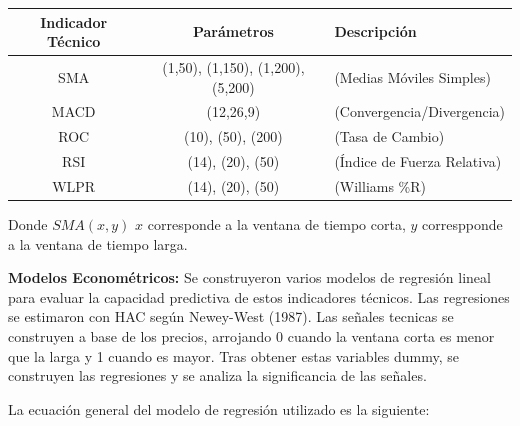 \documentclass[a0,portrait]{a0poster}
\begin{document}
\begin{multicols}{2}
\begin{minipage}{.984\linewidth}
        \begin{tabular}{ccl}
            \toprule
            \textbf{Indicador Técnico} & \textbf{Parámetros} & \textbf{Descripción}\\
            \midrule
             SMA & (1,50), (1,150), (1,200), (5,200)  & (Medias Móviles Simples)\\
             MACD & (12,26,9) & (Convergencia/Divergencia) \\
             ROC & (10), (50), (200) & (Tasa de Cambio) \\
             RSI & (14), (20), (50) & (Índice de Fuerza Relativa) \\
             WLPR & (14), (20), (50) &  (Williams \%R)\\
            \bottomrule
        \end{tabular}
        \captionsetup{width=0.8\textwidth}  %
        \caption*{\footnotesize Donde $SMA(x,y)$ $x$ corresponde a la ventana de tiempo corta, $y$ correspponde a la ventana de tiempo larga.}
        \end{minipage}
    \par
    \textbf{Modelos Econométricos:} Se construyeron varios modelos de regresión lineal para evaluar la capacidad predictiva de 
    estos indicadores técnicos. Las regresiones se estimaron con HAC según Newey-West (1987). Las señales tecnicas se construyen 
    a base de los precios, arrojando 0 cuando la ventana corta es menor que la larga y 1 cuando es mayor. Tras obtener estas 
    variables dummy, se construyen las regresiones y se analiza la significancia de 
    las señales. 
    
    La ecuación general del modelo de regresión utilizado es la siguiente:

\begin{minipage}{.984\linewidth}
    \centering
    \vspace{1cm}
    \begin{tabular}{cl}
        \toprule


\end{tabular}
\end{minipage}
\end{multicols}
\end{document}
